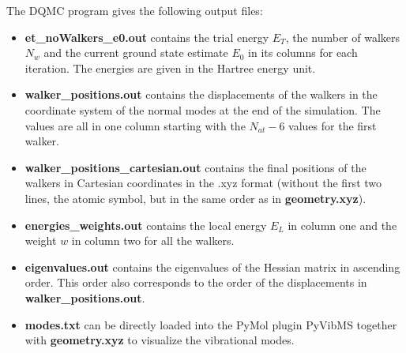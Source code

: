 \documentclass [12pt]{report}
\begin{document}
\begin{appendices}
The DQMC program gives the following output files:
\begin{itemize}
\item \textbf{et\_noWalkers\_e0.out} contains the trial energy $E_T$, the number of walkers $N_w$ and the current ground state estimate $E_0$ in its columns for each iteration. The energies are given in the Hartree energy unit.
\item \textbf{walker\_positions.out} contains the displacements of the walkers in the coordinate system of the normal modes at the end of the simulation. The values are all in one column starting with the $N_{at}-6$ values for the first walker.
\item \textbf{walker\_positions\_cartesian.out} contains the final positions of the walkers in Cartesian coordinates in the .xyz format (without the first two lines, the atomic symbol, but in the same order as in \textbf{geometry.xyz}).
\item \textbf{energies\_weights.out} contains the local energy $E_L$ in column one and the weight $w$ in column two for all the walkers.
\item \textbf{eigenvalues.out} contains the eigenvalues of the Hessian matrix in ascending order. This order also corresponds to the order of the displacements in \textbf{walker\_positions.out}.
\item \textbf{modes.txt} can be directly loaded into the PyMol plugin PyVibMS \cite{PyVibMS} together with \textbf{geometry.xyz} to visualize the vibrational modes.
\end{itemize}

\end{appendices}



\end{document}
